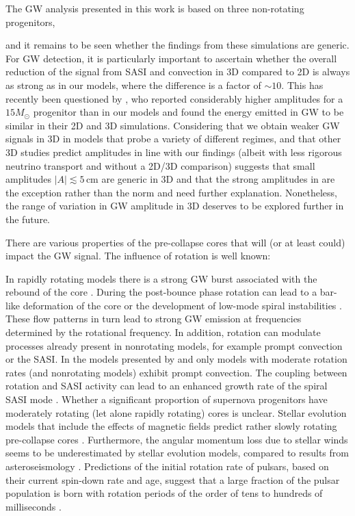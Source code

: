 The GW analysis presented in this work is based on three non-rotating
progenitors, {and it remains to be seen whether the findings
  from these simulations are generic. For GW detection, it is
  particularly important to ascertain whether the overall reduction of
  the signal from SASI and convection in 3D compared to 2D is always
  as strong as in our models, where the difference is a factor of
  $\mathord{\sim} 10$. This has recently been questioned by
  \citet{yakunin_17}, who reported considerably higher
  amplitudes for a $15 M_\odot$ progenitor than in our models and
  found the energy emitted in GW to be similar in their 2D and 3D
  simulations. Considering that we obtain weaker GW signals in 3D in
  models that probe a variety of different regimes, and that other 3D
  studies \citep{mueller_e_12,kuroda_16} predict amplitudes in line
  with our findings (albeit with less rigorous neutrino transport and
  without a 2D/3D comparison) suggests that small amplitudes
  $|A|\lesssim 5 \, \mathrm{cm}$ are generic in 3D and that the strong
  amplitudes in \citet{yakunin_17} are the exception rather than the
  norm and need further explanation. Nonetheless, the range of variation in GW amplitude in 3D
deserves to be explored further in the future.

There are various properties of the pre-collapse cores that will
(or at least could) impact the GW signal. The influence of rotation is well known:}
 In rapidly rotating models there is a strong GW burst
associated with the rebound of the core \citep{mueller_82}.
During the post-bounce phase rotation can lead to a
bar-like deformation of the core \citep{rampp_98,shibata_05} or the development
of low-mode spiral instabilities \citep{ott_05,kuroda_14,takiwaki_16}.
These flow patterns in turn lead to strong GW emission at frequencies 
determined by the rotational frequency.
In addition, rotation can modulate processes
already present in nonrotating models, for example prompt convection or the SASI. 
In the models presented by \citet{dimmelmeier_08} and \citet{ott_12}
only models with moderate rotation rates (and nonrotating models) exhibit prompt convection.
The coupling between rotation and SASI activity can lead to an enhanced growth 
rate of the spiral SASI mode \citep{blondin_07a,yamasaki_08,iwakami_09,kazeroni_16,janka_16}. 
Whether a significant proportion of supernova progenitors have moderately rotating (let alone rapidly rotating) cores is unclear. 
Stellar evolution models that include the effects of magnetic fields predict rather slowly rotating
pre-collapse cores \citep{heger_05}. Furthermore, the angular momentum loss due to stellar winds 
seems to be underestimated by stellar evolution models, compared to results from asteroseismology \citep{cantiello_14}.
Predictions of the initial rotation rate of pulsars, based on their current
spin-down rate and age, suggest that a large fraction of the pulsar population is born 
with rotation periods of the order of tens to hundreds of milliseconds \citep{popov_12,noutsos_13}. 

